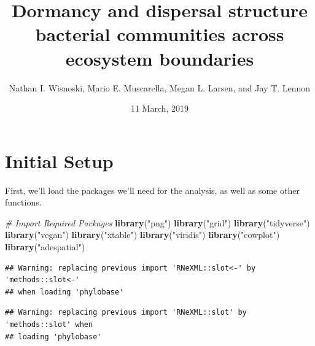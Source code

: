 \documentclass[]{article}
\title{Dormancy and dispersal structure bacterial communities across ecosystem
boundaries}
\author{Nathan I. Wisnoski, Mario E. Muscarella, Megan L. Larsen, and Jay T.
Lennon}
\date{11 March, 2019}
\newenvironment{Shaded}{\begin{snugshade}}{\end{snugshade}}
\newcommand{\KeywordTok}[1]{\textcolor[rgb]{0.13,0.29,0.53}{\textbf{#1}}}
\newcommand{\StringTok}[1]{\textcolor[rgb]{0.31,0.60,0.02}{#1}}
\newcommand{\CommentTok}[1]{\textcolor[rgb]{0.56,0.35,0.01}{\textit{#1}}}
\newcommand{\NormalTok}[1]{#1}
\begin{document}
\maketitle

\section{Initial Setup}\label{initial-setup}

First, we'll load the packages we'll need for the analysis, as well as
some other functions.

\begin{Shaded}
\begin{Highlighting}[]
\CommentTok{# Import Required Packages}
\KeywordTok{library}\NormalTok{(}\StringTok{"png"}\NormalTok{)}
\KeywordTok{library}\NormalTok{(}\StringTok{"grid"}\NormalTok{)}
\KeywordTok{library}\NormalTok{(}\StringTok{"tidyverse"}\NormalTok{)   }
\KeywordTok{library}\NormalTok{(}\StringTok{"vegan"}\NormalTok{)}
\KeywordTok{library}\NormalTok{(}\StringTok{"xtable"}\NormalTok{)}
\KeywordTok{library}\NormalTok{(}\StringTok{"viridis"}\NormalTok{)}
\KeywordTok{library}\NormalTok{(}\StringTok{"cowplot"}\NormalTok{)}
\KeywordTok{library}\NormalTok{(}\StringTok{"adespatial"}\NormalTok{)}
\end{Highlighting}
\end{Shaded}

\begin{verbatim}
## Warning: replacing previous import 'RNeXML::slot<-' by 'methods::slot<-'
## when loading 'phylobase'
\end{verbatim}

\begin{verbatim}
## Warning: replacing previous import 'RNeXML::slot' by 'methods::slot' when
## loading 'phylobase'
\end{verbatim}
\end{document}
